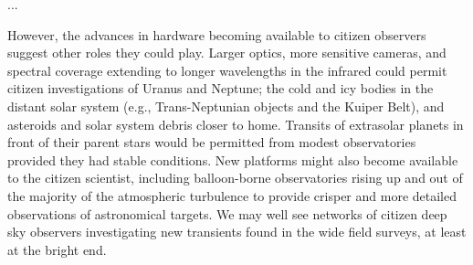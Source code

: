 \documentclass{ar2e}
\begin{document}



...




However, the advances in hardware becoming available to citizen observers
suggest other roles they could play. Larger optics, more sensitive cameras, and
spectral coverage extending to longer wavelengths in the infrared could permit
citizen investigations of Uranus and Neptune; the cold and icy bodies in the
distant solar system (e.g., Trans-Neptunian objects and the Kuiper Belt), and
asteroids and solar system debris closer to home.  Transits of extrasolar
planets in front of their parent stars would be permitted from modest
observatories provided they had stable conditions.  New platforms might also
become available to the citizen scientist, including balloon-borne observatories
rising up and out of the majority of the atmospheric turbulence to provide
crisper and more detailed observations of astronomical targets. We may well see
networks of citizen deep sky observers investigating new transients found in the
wide field surveys, at least at the bright end. 
\end{document}
